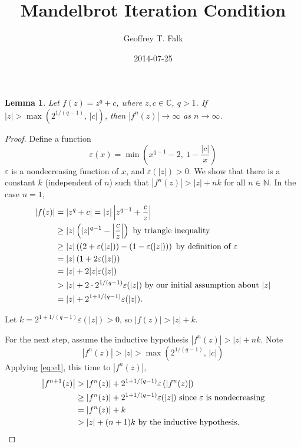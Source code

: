 \documentclass[11pt]{article}
\date{2014-07-25}
\author{Geoffrey T. Falk}
\title{Mandelbrot Iteration Condition}
\begin{document}

\maketitle

\newtheorem*{lemma}{Lemma}

\begin{lemma}
Let \( f(z) = z^q + c \), where \( z, c \in \mathbb{C} \), \( q > 1 \).
If \( |z| > \max\left(2^{1/(q-1)},\, |c|\right) \), then
\( |f^n(z)| \rightarrow \infty \) as \( n \rightarrow \infty \).
\end{lemma}

\begin{proof}
Define a function
\[
\varepsilon(x) = \min\left(x^{q-1} - 2,\ 1 - \frac{|c|}{x}\right)
\]
\( \varepsilon \) is a nondecreasing function of \( x \), and \( \varepsilon(|z|) > 0 \).
We show that there is a constant \( k \) (independent of \( n \)) such that
\( |f^n(z)| > |z| + n k \) for all \( n \in \mathbb{N} \). In the case \( n = 1 \),
\begin{equation} \label{eq:e1}
\begin{aligned}
|f(z)| &= \left| z^q + c \right| = |z| \left| z^{q-1} + \frac{c}{z} \right| \\
&\geq |z| \left( |z|^{q-1} - {\left|\frac{c}{z}\right|} \right) \text{ by triangle inequality} \\
&\geq |z| \left( \left(2 + \varepsilon(|z|) \right) - \left(1 - \varepsilon(|z|)\right) \right)
 \text{ by definition of \( \varepsilon \)} \\
&= |z| \left(1 + 2 \varepsilon(|z|) \right) \\
&= |z| + 2 |z| \varepsilon(|z|) \\
&> |z| + 2 \cdot 2^{{1/(q-1)}} \varepsilon(|z|) \text{ by our initial assumption about } |z| \\
&= |z| + 2^{1 + {1/(q-1)}} \varepsilon(|z|).
\end{aligned}
\end{equation}

Let \( k = 2^{1 + {1/(q-1)}} \varepsilon(|z|) > 0 \), so \( |f(z)| > |z| + k \).

For the next step, assume the inductive hypothesis \( |f^n(z)| > |z| + n k \).
Note
\[
|f^n(z)| > |z| > \max\left(2^{1/(q-1)},\, |c|\right)
\]
Applying \eqref{eq:e1}, this time to \( |f^n(z)| \),
\begin{equation} \label{eq:e2}
\begin{aligned}
\left|f^{n+1}(z)\right| 
&> \left|f^n(z)\right| +  2^{1 + {1/(q-1)}} \varepsilon\left( \left|f^n(z)\right| \right) \\
&\geq \left|f^n(z)\right| + 2^{1 + {1/(q-1)}} \varepsilon(|z|) \text{ since \( \varepsilon \) is nondecreasing} \\
&= \left|f^n(z)\right| + k \\
&> |z| + (n+1)k \text{ by the inductive hypothesis.}
\end{aligned}
\end{equation}
\end{proof}
\end{document}
